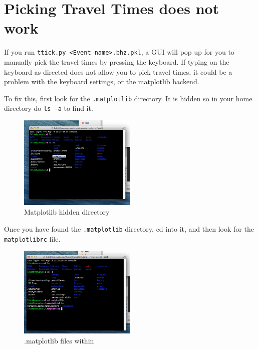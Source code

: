 \documentclass[letterpaper,10pt]{article}
\begin{document}


\section{Picking Travel Times does not work}

If you run \verb"ttick.py <Event name>.bhz.pkl", a GUI will pop up for you to manually pick the travel times by pressing the keyboard. If typing on the keyboard as directed does not allow you to pick travel times, it could be a problem with the keyboard settings, or the matplotlib backend. 

To fix this, first look for the \verb".matplotlib" directory. It is hidden so in your home directory do \verb"ls -a" to find it.

\begin{figure}[h!]
  \centering
  \includegraphics[width=0.5\textwidth]{images/matplotlib_hidden_directory}
  \caption{Matplotlib hidden directory}
  \label{fig:matplotlib_hidden_directory}
\end{figure}

Once you have found the \verb".matplotlib" directory, cd into it, and then look for the \verb"matplotlibrc" file. 

\begin{figure}[h!]
  \centering
  \includegraphics[width=0.5\textwidth]{images/files_in_matplotlib}
  \caption{.matplotlib files within}
  \label{fig:files_in_matplotlib}
\end{figure}
\end{document}
